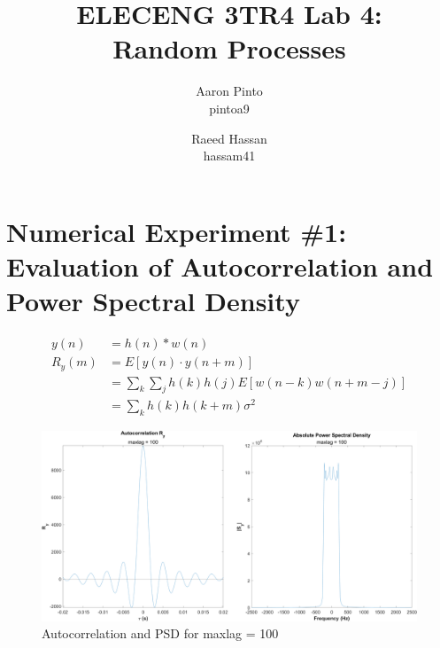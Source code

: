 \documentclass[12pt]{article}
\title{ELECENG 3TR4 Lab 4: \\ Random Processes}
\author{
    Aaron Pinto \\ pintoa9
    \and
    Raeed Hassan \\ hassam41
}
\begin{document}
\maketitle
\clearpage

\section*{Numerical Experiment \#1: Evaluation of Autocorrelation and Power Spectral Density}

\begin{equation*}
\begin{aligned}
        y(n) &= h(n)\ast w(n) \\
	R_y(m) &= E\left[y(n)\cdot y(n+m)\right] \\
        &= \sum_k\sum_j h(k)h(j)E[w(n-k)w(n+m-j)] \\
	&= \sum_k h(k)h(k+m)\sigma^2
\end{aligned}
\end{equation*}



\begin{figure}[h]
	\centering
	\includegraphics[width=\textwidth]{exp1_maxlag_100}
	\caption{\label{fig:exp1_maxlag100}Autocorrelation and PSD for maxlag = 100}
\end{figure}
\end{document}

